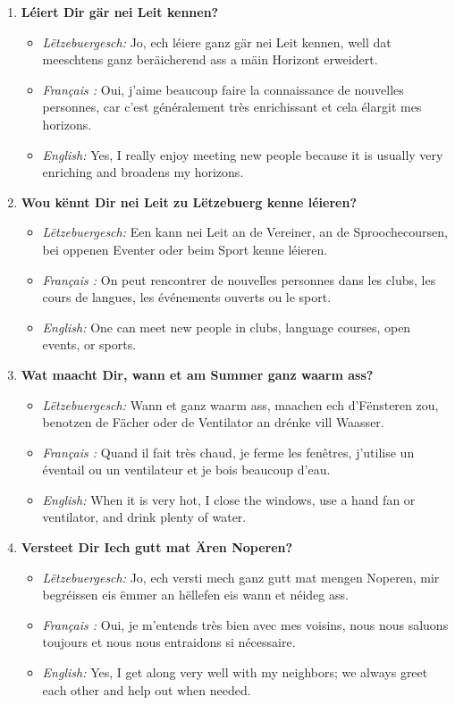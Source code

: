 \begin{enumerate}
    \item \textbf{Léiert Dir gär nei Leit kennen?}
    \begin{itemize}
        \item \textit{Lëtzebuergesch:} Jo, ech léiere ganz gär nei Leit kennen, well dat meeschtens ganz beräicherend ass a mäin Horizont erweidert.
        \item \textit{Français :} Oui, j'aime beaucoup faire la connaissance de nouvelles personnes, car c'est généralement très enrichissant et cela élargit mes horizons.
        \item \textit{English:} Yes, I really enjoy meeting new people because it is usually very enriching and broadens my horizons.
    \end{itemize}

    \item \textbf{Wou kënnt Dir nei Leit zu Lëtzebuerg kenne léieren?}
    \begin{itemize}
        \item \textit{Lëtzebuergesch:} Een kann nei Leit an de Vereiner, an de Sproochecoursen, bei oppenen Eventer oder beim Sport kenne léieren.
        \item \textit{Français :} On peut rencontrer de nouvelles personnes dans les clubs, les cours de langues, les événements ouverts ou le sport.
        \item \textit{English:} One can meet new people in clubs, language courses, open events, or sports.
    \end{itemize}

    \item \textbf{Wat maacht Dir, wann et am Summer ganz waarm ass?}
    \begin{itemize}
        \item \textit{Lëtzebuergesch:} Wann et ganz waarm ass, maachen ech d'Fënsteren zou, benotzen de Fächer oder de Ventilator an drénke vill Waasser.
        \item \textit{Français :} Quand il fait très chaud, je ferme les fenêtres, j'utilise un éventail ou un ventilateur et je bois beaucoup d'eau.
        \item \textit{English:} When it is very hot, I close the windows, use a hand fan or ventilator, and drink plenty of water.
    \end{itemize}

    \item \textbf{Versteet Dir Iech gutt mat Ären Noperen?}
    \begin{itemize}
        \item \textit{Lëtzebuergesch:} Jo, ech versti mech ganz gutt mat mengen Noperen, mir begréissen eis ëmmer an hëllefen eis wann et néideg ass.
        \item \textit{Français :} Oui, je m'entends très bien avec mes voisins, nous nous saluons toujours et nous nous entraidons si nécessaire.
        \item \textit{English:} Yes, I get along very well with my neighbors; we always greet each other and help out when needed.
    \end{itemize}


\end{enumerate}

